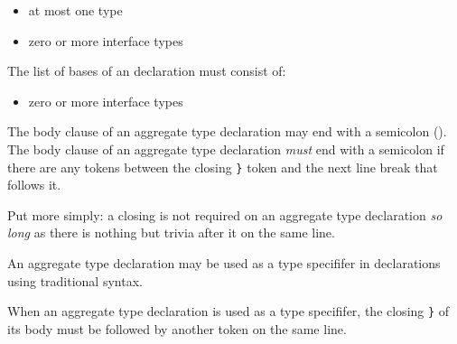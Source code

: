 \begin{itemize}
\item at most one  type
\item zero or more interface types
\end{itemize}

The list of bases of an  declaration must consist of:

\begin{itemize}
\item zero or more interface types
\end{itemize}

\begin{Legacy}

The body clause of an aggregate type declaration may end with a semicolon (\code{;}).
The body clause of an aggregate type declaration \emph{must} end with a semicolon if there are any tokens between the closing \lstinline|}| token and the next line break that follows it.

\begin{Note}
Put more simply: a closing \code{;} is not required on an aggregate type declaration \emph{so long} as there is nothing but trivia after it on the same line.
\end{Note}

\end{Legacy}

\begin{Legacy}

An aggregate type declaration may be used as a type specififer in declarations using traditional syntax.

When an aggregate type declaration is used as a type specififer, the closing \lstinline|}| of its body must be followed by another token on the same line.

\end{Legacy}


\begin{Syntax}
     \\
          \\
        \SynOpt \\
        \SynOpt
        \SynOpt \\
         \code{;}\SynOpt\\

     \\
         \\
        \SynOr {}
\end{Syntax}

